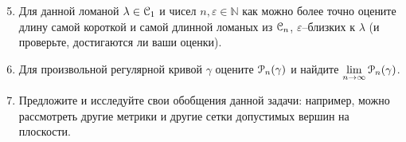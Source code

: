\begin{enumerate}
\setcounter{enumi}{4}
\item Для данной ломаной $\lambda \in \EuScript C_1$ и чисел $n, \varepsilon \in \mathbb N$ как можно более точно оцените длину самой короткой и самой длинной ломаных из $\EuScript C_n$, $\varepsilon$--близких к $\lambda$ (и проверьте, достигаются ли ваши оценки).

\item Для произвольной регулярной кривой $\gamma$ оцените $\EuScript P_n (\gamma)$ и найдите $\lim\limits_{n \to \infty} \EuScript P_n (\gamma)$.

\item Предложите и исследуйте свои обобщения данной задачи: например, можно рассмотреть другие метрики и другие сетки допустимых вершин на плоскости.
\end{enumerate}